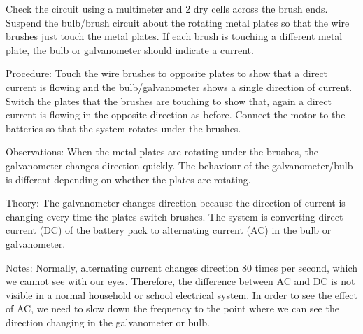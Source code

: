 \begin{multicols}{2}
\begin{description*}
{Check the circuit using a multimeter and 2 dry cells across the brush ends. Suspend the bulb/brush circuit about the rotating metal plates so that the wire brushes just touch the metal plates. If each brush is touching a different metal plate, the bulb or galvanometer should indicate a current.}
\item[Procedure:]{Touch the wire brushes to opposite plates to show that a direct current is flowing and the bulb/galvanometer shows a single direction of current. Switch the plates that the brushes are touching to show that, again a direct current is flowing in the opposite direction as before. Connect the motor to the batteries so that the system rotates under the brushes.}
\item[Observations:]{When the metal plates are rotating under the brushes, the galvanometer changes direction quickly. The behaviour of the galvanometer/bulb is different depending on whether the plates are rotating.}
\item[Theory:]{The galvanometer changes direction because the direction of current is changing every time the plates switch brushes. The system is converting direct current (DC) of the battery pack to alternating current (AC) in the bulb or galvanometer.}
\item[Notes:]{Normally, alternating current changes direction 80 times per second, which we cannot see with our eyes. Therefore, the difference between AC and DC is not visible in a normal household or school electrical system. In order to see the effect of AC, we need to slow down the frequency to the point where we can see the direction changing in the galvanometer or bulb.}
\end{description*}

\end{multicols}





\pagebreak
